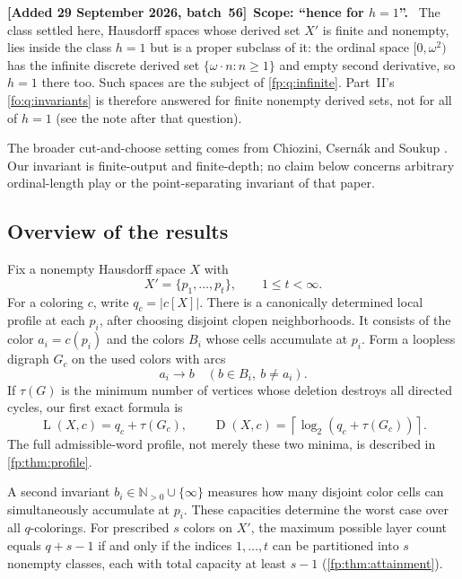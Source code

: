 \documentclass[11pt,letterpaper]{article}
\numberwithin{equation}{section}
\theoremstyle{definition}
\theoremstyle{remark}
\theoremstyle{definition}
\newcommand{\ceil}[1]{\left\lceil#1\right\rceil}
\newcommand{\N}{\mathbb N}
\newcommand{\depth}{\operatorname{D}}
\newcommand{\layers}{\operatorname{L}}
\newenvironment{writenotec}[1][]{\par\smallskip\begingroup\small\sloppy
 \noindent\textbf{[Added 29 September 2026, batch~56]}\if\relax\detokenize{#1}\relax\else~\textbf{#1.}\fi\ }%
 {\par\endgroup\smallskip}
\begin{document}
\begin{writenotec}[Scope: ``hence for $h=1$'']
The class settled here, Hausdorff spaces whose derived set $X'$ is finite
and nonempty, lies inside the class $h=1$ but is a proper subclass of it: the
ordinal space $[0,\omega^2)$ has the infinite discrete derived set
$\{\omega\cdot n:n\ge1\}$ and empty second derivative, so $h=1$ there too.
Such spaces are the subject of \cref{fp:q:infinite}. Part~II's
\cref{fo:q:invariants} is therefore answered for finite nonempty derived
sets, not for all of $h=1$ (see the note after that question).
\end{writenotec}

The broader cut-and-choose setting comes from Chiozini, Csern\'ak and
Soukup \cite{CCS}. Our invariant is finite-output and finite-depth; no
claim below concerns arbitrary ordinal-length play or the point-separating
invariant of that paper.

\subsection{Overview of the results}

Fix a nonempty Hausdorff space \(X\) with
\[
 X'=\{p_1,\ldots,p_t\},\qquad 1\leq t<\infty.
\]
For a coloring \(c\), write \(q_c=|c[X]|\). There is a canonically determined
local profile at each \(p_i\), after choosing disjoint clopen neighborhoods.
It consists of the color \(a_i=c(p_i)\) and the colors \(B_i\) whose cells
accumulate at \(p_i\). Form a loopless digraph \(G_c\) on the used colors
with arcs
\begin{equation}\label{fp:eq:graph-intro}
 a_i\longrightarrow b\quad(b\in B_i,\ b\ne a_i).
\end{equation}
If \(\tau(G)\) is the minimum number of vertices whose deletion destroys
all directed cycles, our first exact formula is
\begin{equation}\label{fp:eq:main-intro}
 \boxed{\quad
 \layers(X,c)=q_c+\tau(G_c),\qquad
 \depth(X,c)=\ceil{\log_2(q_c+\tau(G_c))}.
 \quad}
\end{equation}
The full admissible-word profile, not merely these two minima, is described
in \cref{fp:thm:profile}.

A second invariant \(b_i\in\N_{>0}\cup\{\infty\}\) measures how many
disjoint color cells can simultaneously accumulate at \(p_i\). These
capacities determine the worst case over all \(q\)-colorings. For prescribed
\(s\) colors on \(X'\), the maximum possible layer count equals \(q+s-1\)
if and only if the indices \(1,\ldots,t\) can be partitioned into \(s\)
nonempty classes, each with total capacity at least \(s-1\)
(\cref{fp:thm:attainment}).
\end{document}
